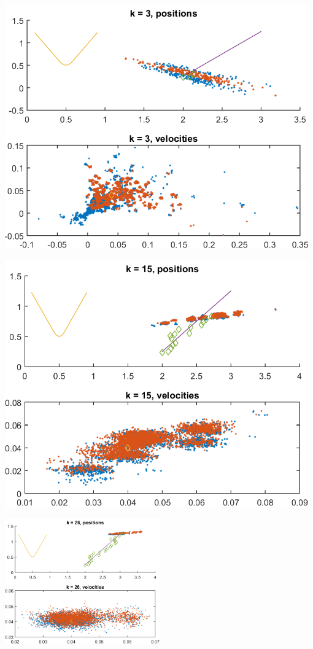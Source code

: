 \documentclass[english,DIV=13]{scrartcl}
\begin{document}
  \begin{center}
	\begin{minipage}{.5\textwidth}
   		\includegraphics[width=0.98\textwidth]{img/q4_3.png}
	\end{minipage}%
	\begin{minipage}{.5\textwidth}
		 \includegraphics[width=0.98\textwidth]{img/q4_15.png}
	\end{minipage}
\end{center}
  \begin{center}
		 \includegraphics[width=0.5\textwidth]{img/q4_26.png}
\end{center}
  
\end{document}
